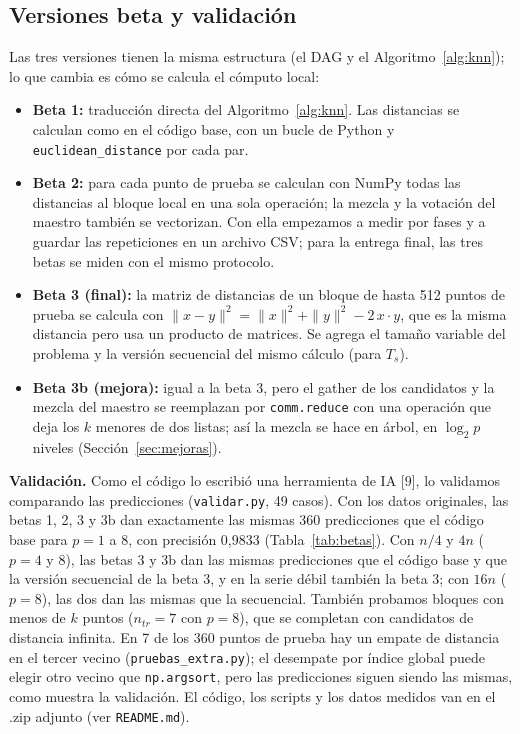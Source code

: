 \documentclass[11pt,a4paper]{article}
\newcommand{\ntr}{n_{tr}}
\begin{document}
\subsection{Versiones beta y validación}
\label{sec:validacion}

Las tres versiones tienen la misma estructura (el DAG y el Algoritmo~\ref{alg:knn}); lo que cambia es cómo se calcula el cómputo local:
\begin{itemize}[nosep]
  \item \textbf{Beta 1:} traducción directa del Algoritmo~\ref{alg:knn}. Las distancias se calculan como en el código base, con un bucle de Python y \texttt{euclidean\_distance} por cada par.
  \item \textbf{Beta 2:} para cada punto de prueba se calculan con NumPy todas las distancias al bloque local en una sola operación; la mezcla y la votación del maestro también se vectorizan. Con ella empezamos a medir por fases y a guardar las repeticiones en un archivo CSV; para la entrega final, las tres betas se miden con el mismo protocolo.
  \item \textbf{Beta 3 (final):} la matriz de distancias de un bloque de hasta 512 puntos de prueba se calcula con $\|x-y\|^2 = \|x\|^2 + \|y\|^2 - 2\,x\cdot y$, que es la misma distancia pero usa un producto de matrices. Se agrega el tamaño variable del problema y la versión secuencial del mismo cálculo (para $T_s$).
  \item \textbf{Beta 3b (mejora):} igual a la beta 3, pero el gather de los candidatos y la mezcla del maestro se reemplazan por \texttt{comm.reduce} con una operación que deja los $k$ menores de dos listas; así la mezcla se hace en árbol, en $\log_2 p$ niveles (Sección~\ref{sec:mejoras}).
\end{itemize}

\textbf{Validación.} Como el código lo escribió una herramienta de IA [9], lo validamos comparando las predicciones (\texttt{validar.py}, 49 casos). Con los datos originales, las betas 1, 2, 3 y 3b dan exactamente las mismas 360 predicciones que el código base para $p = 1$ a $8$, con precisión 0,9833 (Tabla~\ref{tab:betas}). Con $n/4$ y $4n$ ($p = 4$ y $8$), las betas 3 y 3b dan las mismas predicciones que el código base y que la versión secuencial de la beta 3, y en la serie débil también la beta 3; con $16n$ ($p = 8$), las dos dan las mismas que la secuencial. También probamos bloques con menos de $k$ puntos ($\ntr = 7$ con $p = 8$), que se completan con candidatos de distancia infinita. En 7 de los 360 puntos de prueba hay un empate de distancia en el tercer vecino (\texttt{pruebas\_extra.py}); el desempate por índice global puede elegir otro vecino que \texttt{np.argsort}, pero las predicciones siguen siendo las mismas, como muestra la validación. El código, los scripts y los datos medidos van en el .zip adjunto (ver \texttt{README.md}).
\end{document}
